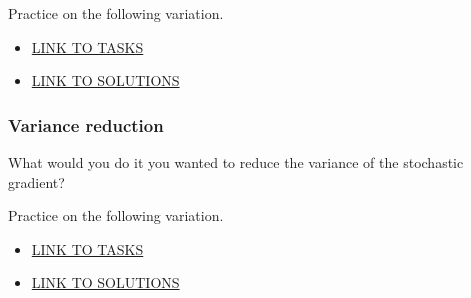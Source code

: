\documentclass[
]{article}
\begin{document}
Practice on the following variation.

\begin{itemize}
\item
  \href{http://htmlpreview.github.io/?https://github.com/georgios-stats/Machine_Learning_and_Neural_Networks_III_Epiphany_2023/tree/main/Computer_practical/Stochastic_learning_methods_PrSG_tasks.nb.html}{LINK
  TO TASKS}
\item
  \href{http://htmlpreview.github.io/?https://github.com/georgios-stats/Machine_Learning_and_Neural_Networks_III_Epiphany_2023/tree/main/Computer_practical/Stochastic_learning_methods_PrSG_solutions.nb.html}{LINK
  TO SOLUTIONS}
\end{itemize}

\hypertarget{variance-reduction}{%
\subsubsection{Variance reduction}\label{variance-reduction}}

What would you do it you wanted to reduce the variance of the stochastic
gradient?

Practice on the following variation.

\begin{itemize}
\item
  \href{http://htmlpreview.github.io/?https://github.com/georgios-stats/Machine_Learning_and_Neural_Networks_III_Epiphany_2023/tree/main/Computer_practical/Stochastic_learning_methods_VRSG_tasks.nb.html}{LINK
  TO TASKS}
\item
  \href{http://htmlpreview.github.io/?https://github.com/georgios-stats/Machine_Learning_and_Neural_Networks_III_Epiphany_2023/tree/main/Computer_practical/Stochastic_learning_methods_VRSG_solutions.nb.html}{LINK
  TO SOLUTIONS}
\end{itemize}
\end{document}
